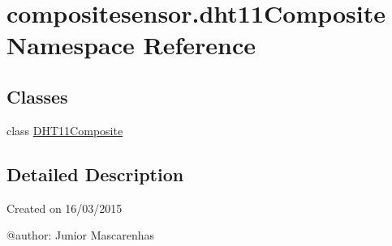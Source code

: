 \hypertarget{namespacecompositesensor_1_1dht11Composite}{}\section{compositesensor.\+dht11\+Composite Namespace Reference}
\label{namespacecompositesensor_1_1dht11Composite}
\subsection*{Classes}
\begin{DoxyCompactItemize}
\item 
class \hyperlink{classcompositesensor_1_1dht11Composite_1_1DHT11Composite}{D\+H\+T11\+Composite}
\end{DoxyCompactItemize}


\subsection{Detailed Description}
\begin{DoxyVerb}Created on 16/03/2015

@author: Junior Mascarenhas
\end{DoxyVerb}
 